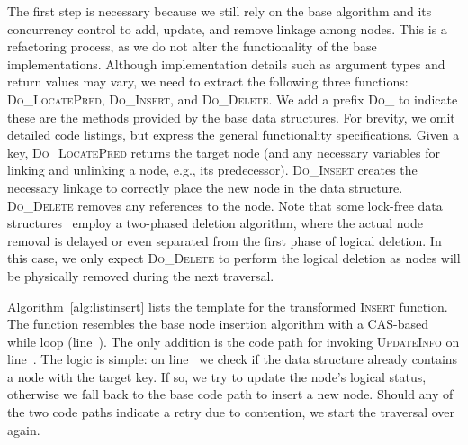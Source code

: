 \documentclass{sig-alternate-05-2015}
\begin{document}
The first step is necessary because we still rely on the base algorithm and its concurrency control to add, update, and remove linkage among nodes.
This is a refactoring process, as we do not alter the functionality of the base implementations. 
Although implementation details such as argument types and return values may vary, we need to extract the following three functions: \textsc{Do\_LocatePred}, \textsc{Do\_Insert}, and \textsc{Do\_Delete}.
We add a prefix \textsc{Do\_} to indicate these are the methods provided by the base data structures.
For brevity, we omit detailed code listings, but express the general functionality specifications.
Given a key, \textsc{Do\_LocatePred} returns the target node (and any necessary variables for linking and unlinking a node, e.g., its predecessor).
\textsc{Do\_Insert} creates the necessary linkage to correctly place the new node in the data structure.
\textsc{Do\_Delete} removes any references to the node.
Note that some lock-free data structures~\cite{harris2001pragmatic,fraser2004practical} employ a two-phased deletion algorithm, where the actual node removal is delayed or even separated from the first phase of logical deletion.
In this case, we only expect \textsc{Do\_Delete} to perform the logical deletion as nodes will be physically removed during the next traversal.

Algorithm~\ref{alg:listinsert} lists the template for the transformed \textsc{Insert} function.
The function resembles the base node insertion algorithm with a CAS-based while loop (line~).
The only addition is the code path for invoking \textsc{UpdateInfo} on line~.
The logic is simple: on line~ we check if the data structure already contains a node with the target key.
If so, we try to update the node's logical status, otherwise we fall back to the base code path to insert a new node. 
Should any of the two code paths indicate a retry due to contention, we start the traversal over again.
\end{document}
